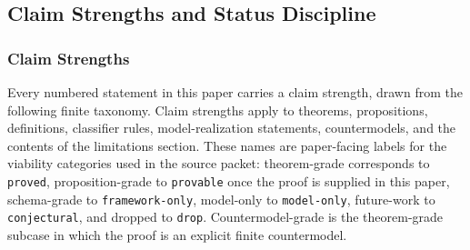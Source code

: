 \documentclass[11pt]{article}
\theoremstyle{definition}
\begin{document}
\subsection{Claim Strengths and Status Discipline}

\subsubsection{Claim Strengths}

Every numbered statement in this paper carries a claim strength, drawn from the following finite taxonomy. Claim strengths apply to theorems, propositions, definitions, classifier rules, model-realization statements, countermodels, and the contents of the limitations section. These names are paper-facing labels for the viability categories used in the source packet: theorem-grade corresponds to \texttt{proved}, proposition-grade to \texttt{provable} once the proof is supplied in this paper, schema-grade to \texttt{framework-only}, model-only to \texttt{model-only}, future-work to \texttt{conjectural}, and dropped to \texttt{drop}. Countermodel-grade is the theorem-grade subcase in which the proof is an explicit finite countermodel.
\end{document}

